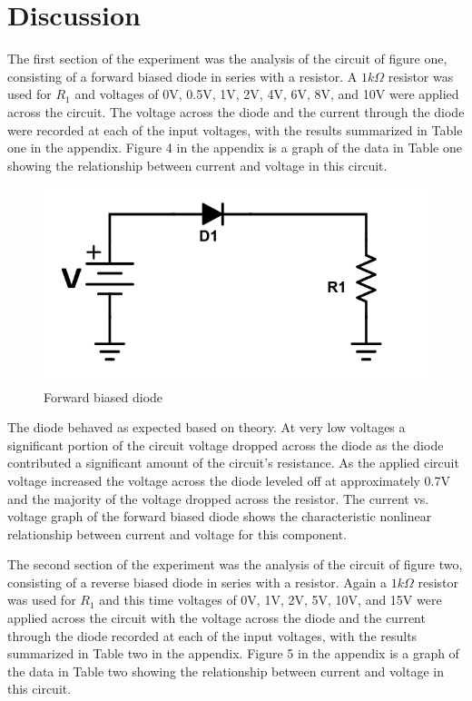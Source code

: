 \documentclass{article}
\begin{document}
\section*{Discussion}
The first section of the experiment was the analysis of the circuit of figure one, consisting of a forward biased diode in series with a resistor.  A $1k\Omega$ resistor was used for $R_1$ and voltages of 0V, 0.5V, 1V, 2V, 4V, 6V, 8V, and 10V were applied across the circuit.  The voltage across the diode and the current through the diode were recorded at each of the input voltages, with the results summarized in Table one in the appendix.  Figure 4 in the appendix is a graph of the data in Table one showing the relationship between current and voltage in this circuit.  
\begin{figure}[H]
\caption{Forward biased diode}
\includegraphics[width=\textwidth]{L1F1.png}
\centering
\end{figure}
The diode behaved as expected based on theory.  At very low voltages a significant portion of the circuit voltage dropped across the diode as the diode contributed a significant amount of the circuit's resistance.  As the applied circuit voltage increased the voltage across the diode leveled off at approximately 0.7V and the majority of the voltage dropped across the resistor.  The current vs. voltage graph of the forward biased diode shows the characteristic nonlinear relationship between current and voltage for this component. 

The second section of the experiment was the analysis of the circuit of figure two, consisting of a reverse biased diode in series with a resistor.  Again a $1k\Omega$ resistor was used for $R_1$ and this time voltages of 0V, 1V, 2V, 5V, 10V, and 15V were applied across the circuit with the voltage across the diode and the current through the diode recorded at each of the input voltages, with the results summarized in Table two in the appendix.  Figure 5 in the appendix is a graph of the data in Table two showing the relationship between current and voltage in this circuit.
\end{document}
